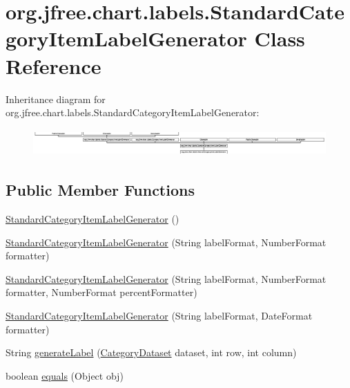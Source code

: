 \hypertarget{classorg_1_1jfree_1_1chart_1_1labels_1_1_standard_category_item_label_generator}{}\section{org.\+jfree.\+chart.\+labels.\+Standard\+Category\+Item\+Label\+Generator Class Reference}
\label{classorg_1_1jfree_1_1chart_1_1labels_1_1_standard_category_item_label_generator}
Inheritance diagram for org.\+jfree.\+chart.\+labels.\+Standard\+Category\+Item\+Label\+Generator\+:\begin{figure}[H]
\begin{center}
\leavevmode
\includegraphics[height=1.048689cm]{classorg_1_1jfree_1_1chart_1_1labels_1_1_standard_category_item_label_generator}
\end{center}
\end{figure}
\subsection*{Public Member Functions}
\begin{DoxyCompactItemize}
\item 
\mbox{\hyperlink{classorg_1_1jfree_1_1chart_1_1labels_1_1_standard_category_item_label_generator_a8604de305c1f4a570eaf64b37ee8ecfb}{Standard\+Category\+Item\+Label\+Generator}} ()
\item 
\mbox{\hyperlink{classorg_1_1jfree_1_1chart_1_1labels_1_1_standard_category_item_label_generator_a976b51a1a12e924f57bb24798187fc1d}{Standard\+Category\+Item\+Label\+Generator}} (String label\+Format, Number\+Format formatter)
\item 
\mbox{\hyperlink{classorg_1_1jfree_1_1chart_1_1labels_1_1_standard_category_item_label_generator_a0a902c7cdc018e1d68dff2af3f6b1908}{Standard\+Category\+Item\+Label\+Generator}} (String label\+Format, Number\+Format formatter, Number\+Format percent\+Formatter)
\item 
\mbox{\hyperlink{classorg_1_1jfree_1_1chart_1_1labels_1_1_standard_category_item_label_generator_af8e62b7281ea3c4e90b682587ef5480c}{Standard\+Category\+Item\+Label\+Generator}} (String label\+Format, Date\+Format formatter)
\item 
String \mbox{\hyperlink{classorg_1_1jfree_1_1chart_1_1labels_1_1_standard_category_item_label_generator_a966ea4561ba36347b8af7e4f2ebe37f6}{generate\+Label}} (\mbox{\hyperlink{interfaceorg_1_1jfree_1_1data_1_1category_1_1_category_dataset}{Category\+Dataset}} dataset, int row, int column)
\item 
boolean \mbox{\hyperlink{classorg_1_1jfree_1_1chart_1_1labels_1_1_standard_category_item_label_generator_ad3180cd33006ff92f752b1e0a8634353}{equals}} (Object obj)
\end{DoxyCompactItemize}
